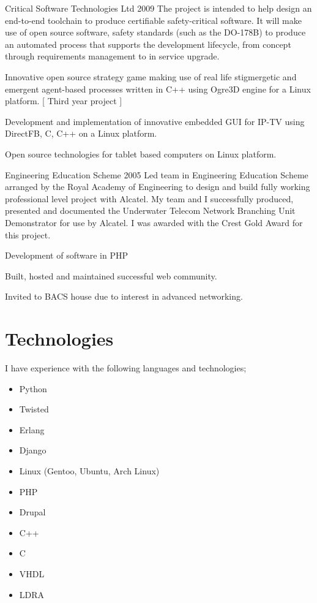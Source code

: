 \documentclass[overlapped,line,letterpaper]{res}
\begin{document}
\begin{resume}
  {Critical Software Technologies Ltd}
  {2009}
{
    The project is intended to help design an end-to-end toolchain to produce
    certifiable safety-critical software.
    It will make use of open source software, safety standards (such as the
    DO-178B) to produce an automated process that supports the development
    lifecycle, from concept through requirements management to in service
    upgrade.
}

{
    Innovative open source strategy game making use of real life stigmergetic
    and emergent agent-based processes written in C++ using Ogre3D engine for a
    Linux platform. [ Third year project ]
}

{
    Development and implementation of innovative embedded GUI for IP-TV using
    DirectFB, C, C++ on a Linux platform.
}

{
    Open source technologies for tablet based computers on Linux platform.
}

  {Engineering Education Scheme}
  {2005}
{
    Led team in Engineering Education Scheme arranged by the Royal Academy of
    Engineering to design and build fully working professional level project
    with Alcatel.
    My team and I successfully produced, presented and documented the Underwater
    Telecom Network Branching Unit Demonstrator for use by Alcatel.
    I was awarded with the Crest Gold Award for this project.
}

{
    Development of software in PHP
}

{
    Built, hosted and maintained successful web community.
}

{
        Invited to BACS house due to interest in advanced networking.
}

\section{\bf{Technologies} }
I have experience with the following languages and technologies;
\begin{itemize}
 \item Python
 \item Twisted
 \item Erlang
 \item Django
 \item Linux (Gentoo, Ubuntu, Arch Linux)
 \item PHP
 \item Drupal
 \item C++
 \item C
 \item VHDL
 \item LDRA
\end{itemize}


\end{resume}
\end{document}
